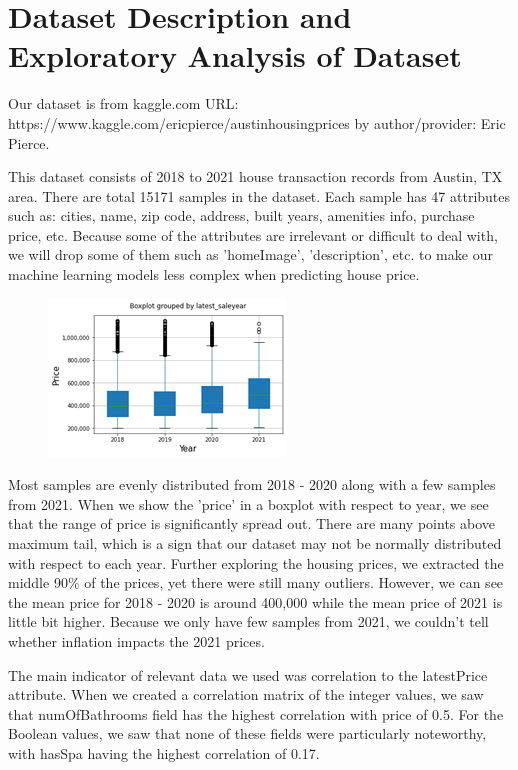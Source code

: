 \documentclass[a4paper]{article}
\begin{document}
	\section{Dataset Description and Exploratory Analysis of Dataset}
	
	Our dataset is from kaggle.com URL: https://www.kaggle.com/ericpierce/austinhousingprices by author/provider: Eric Pierce.
	
	This dataset consists of 2018 to 2021 house transaction records from Austin, TX area. There are total 15171 samples in the dataset. Each sample has 47 attributes such as: cities, name, zip code, address, built years, amenities info, purchase price, etc. Because some of the attributes are irrelevant or difficult to deal with, we will drop some of them such as 'homeImage', 'description', etc. to make our machine learning models less complex when predicting house price. 
	
	\begin{figure}[H]
		\label{fig:fig1}
		\includegraphics[width=0.5\linewidth]{fig1}
	\end{figure}
	
	
	Most samples are evenly distributed from 2018 - 2020 along with a few samples from 2021. When we show the 'price' in a boxplot with respect to year, we see that the range of price is significantly spread out. There are many points above maximum tail, which is a sign that our dataset may not be normally distributed with respect to each year. Further exploring the housing prices, we extracted the middle 90\% of the prices, yet there were still many outliers. However, we can see the mean price for 2018 - 2020 is around 400,000 while the mean price of 2021 is little bit higher. Because we only have few samples from 2021, we couldn't tell whether inflation impacts the 2021 prices.
	
	The main indicator of relevant data we used was correlation to the latestPrice attribute. When we created a correlation matrix of the integer values, we saw that numOfBathrooms field has the highest correlation with price of 0.5. For the Boolean values, we saw that none of these fields were particularly noteworthy, with hasSpa having the highest correlation of 0.17.
	
\end{document}
